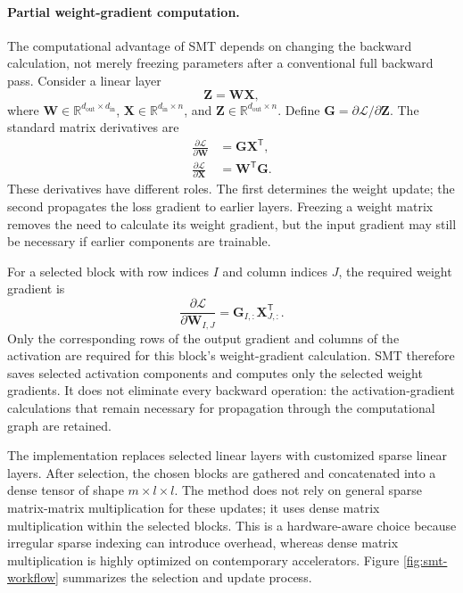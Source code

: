 \paragraph{Partial weight-gradient computation.}
The computational advantage of SMT depends on changing the backward
calculation, not merely freezing parameters after a conventional full
backward pass. Consider a linear layer
\begin{equation}
    \mathbf{Z}=\mathbf{W}\mathbf{X},
    \label{eq:smt-linear-layer}
\end{equation}
where $\mathbf{W}\in\mathbb{R}^{d_{\mathrm{out}}\times d_{\mathrm{in}}}$,
$\mathbf{X}\in\mathbb{R}^{d_{\mathrm{in}}\times n}$, and
$\mathbf{Z}\in\mathbb{R}^{d_{\mathrm{out}}\times n}$. Define
$\mathbf{G}=\partial\mathcal{L}/\partial\mathbf{Z}$. The standard matrix
derivatives are
\begin{align}
    \frac{\partial\mathcal{L}}{\partial\mathbf{W}}
    &=
    \mathbf{G}\mathbf{X}^{\mathsf T},
    \label{eq:smt-weight-gradient}\\
    \frac{\partial\mathcal{L}}{\partial\mathbf{X}}
    &=
    \mathbf{W}^{\mathsf T}\mathbf{G}.
    \label{eq:smt-input-gradient}
\end{align}
These derivatives have different roles. The first determines the weight
update; the second propagates the loss gradient to earlier layers. Freezing
a weight matrix removes the need to calculate its weight gradient, but the
input gradient may still be necessary if earlier components are trainable.

For a selected block with row indices $I$ and column indices $J$, the
required weight gradient is
\begin{equation}
    \frac{\partial\mathcal{L}}
         {\partial\mathbf{W}_{I,J}}
    =
    \mathbf{G}_{I,:}\mathbf{X}_{J,:}^{\mathsf T}.
    \label{eq:smt-selected-block-gradient}
\end{equation}
Only the corresponding rows of the output gradient and columns of the
activation are required for this block's weight-gradient calculation. SMT
therefore saves selected activation components and computes only the
selected weight gradients. It does not eliminate every backward operation:
the activation-gradient calculations that remain necessary for propagation
through the computational graph are retained.

The implementation replaces selected linear layers with customized sparse
linear layers. After selection, the chosen blocks are gathered and
concatenated into a dense tensor of shape $m\times l\times l$. The method
does not rely on general sparse matrix-matrix multiplication for these
updates; it uses dense matrix multiplication within the selected blocks.
This is a hardware-aware choice because irregular sparse indexing can
introduce overhead, whereas dense matrix multiplication is highly optimized
on contemporary accelerators. Figure \ref{fig:smt-workflow} summarizes the
selection and update process.

